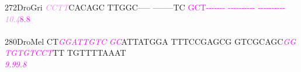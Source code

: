 \documentclass[11pt,twoside,reqno,a4paper]{article}
\begin{document}
{272\hspace*{1\charwidth}DroGri	\textit{\textcolor{violet}{C}}\textit{\textcolor{violet}{C}}\textit{\textcolor{violet}{T}}\textit{\textcolor{violet}{T}}CACAGC	TTGGC-----	--------TC	\textcolor{magenta}{G}\textcolor{magenta}{C}\textcolor{magenta}{T}\textcolor{magenta}{-}\textcolor{magenta}{-}\textcolor{magenta}{-}\textcolor{magenta}{-}\textcolor{magenta}{-}\textcolor{magenta}{-}\textcolor{magenta}{-}	\textcolor{magenta}{-}\textcolor{magenta}{-}\textcolor{magenta}{-}\textcolor{magenta}{-}\textcolor{magenta}{-}\textcolor{magenta}{-}\textcolor{magenta}{-}\textcolor{magenta}{-}\textcolor{magenta}{-}\textcolor{magenta}{-}	\textcolor{magenta}{-}\textcolor{magenta}{-}\textcolor{magenta}{-}\textcolor{magenta}{-}\textcolor{magenta}{-}\textcolor{magenta}{-}\textcolor{magenta}{-}\textcolor{magenta}{-}\textcolor{magenta}{-}\textcolor{magenta}{-}	\\
\hspace*{4\charwidth}\hspace*{7\charwidth}\hspace*{0\charwidth}\textit{\textcolor{violet}{10.4}}\hspace*{1\charwidth}\hspace*{1\charwidth}\hspace*{1\charwidth}\hspace*{26\charwidth}\textcolor{magenta}{8.8}\hspace*{1\charwidth}\hspace*{1\charwidth}\hspace*{1\charwidth}\\
\\
280\hspace*{1\charwidth}DroMel	CT\textit{\textcolor{magenta}{G}}\textit{\textcolor{magenta}{G}}\textit{\textcolor{magenta}{A}}\textit{\textcolor{magenta}{T}}\textit{\textcolor{magenta}{T}}\textit{\textcolor{magenta}{G}}\textit{\textcolor{magenta}{T}}\textit{\textcolor{magenta}{C}}	\textit{\textcolor{magenta}{G}}\textit{\textcolor{magenta}{C}}ATTATGGA	TTTCCGAGCG	GTCGCAGC\textit{\textcolor{magenta}{G}}\textit{\textcolor{magenta}{G}}	\textit{\textcolor{magenta}{T}}\textit{\textcolor{magenta}{G}}\textit{\textcolor{magenta}{T}}\textit{\textcolor{magenta}{G}}\textit{\textcolor{magenta}{T}}\textit{\textcolor{magenta}{C}}\textit{\textcolor{magenta}{C}}\textit{\textcolor{magenta}{T}}TT	TGTTTTAAAT	\\
\hspace*{4\charwidth}\hspace*{7\charwidth}\hspace*{2\charwidth}\textit{\textcolor{magenta}{9.9}}\hspace*{1\charwidth}\hspace*{1\charwidth}\hspace*{1\charwidth}\hspace*{33\charwidth}\textit{\textcolor{magenta}{9.8}}\hspace*{1\charwidth}\hspace*{1\charwidth}\hspace*{1\charwidth}\\
}
\end{document}
